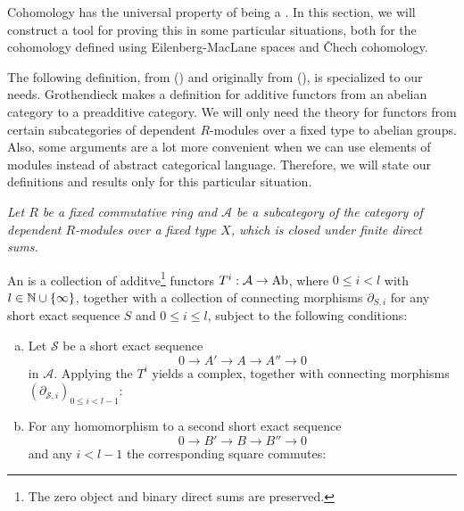 Cohomology has the universal property of being a .
In this section, we will construct a tool for proving this in some particular situations,
both for the cohomology defined using Eilenberg-MacLane spaces and \v{C}hech cohomology.

The following definition, from (\cite[2.1]{tohoku-translation}) and originally from (\cite{tohoku1957}), is specialized to our needs.
Grothendieck makes a definition for additive functors from an abelian category to a preadditive category.
We will only need the theory for functors from certain subcategories of dependent $R$-modules over a fixed type to abelian groups.
Also, some arguments are a lot more convenient when we can use elements of modules instead of abstract categorical language.
Therefore, we will state our definitions and results only for this particular situation.

\emph{Let $R$ be a fixed commutative ring and $\mathcal A$ be a subcategory of the category of dependent $R$-modules over a fixed type $X$, which is closed under finite direct sums.}

\begin{definition}
  An  is a collection of additve\footnote{
    The zero object and binary direct sums are preserved.
  }
  functors
  $T^i:\mathcal A\to \operatorname{Ab}$, where $0\leq i < l$ with $l\in\mathbb{N}\cup\{\infty\}$,
  together with a collection of connecting morphisms $\partial_{S,i}$ for any short exact sequence $S$ and $0\leq i\le l$, subject to the following conditions:
  \begin{enumerate}[(a)]
  \item Let $\mathcal{S}$ be a short exact sequence
    \[ 0\to A'\to A\to A''\to 0\]
    in $\mathcal A$. Applying the $T^i$ yields a complex, together with connecting morphisms $(\partial_{\mathcal{S},i})_{0\leq i<l-1}$:
    \begin{center}
    \end{center}
  \item For any homomorphism to a second short exact sequence
    \[ 0\to B'\to B\to B''\to 0\]
    and any $i<l-1$ the corresponding square commutes:
    \begin{center}
    \end{center}
  \end{enumerate}
\end{definition}


